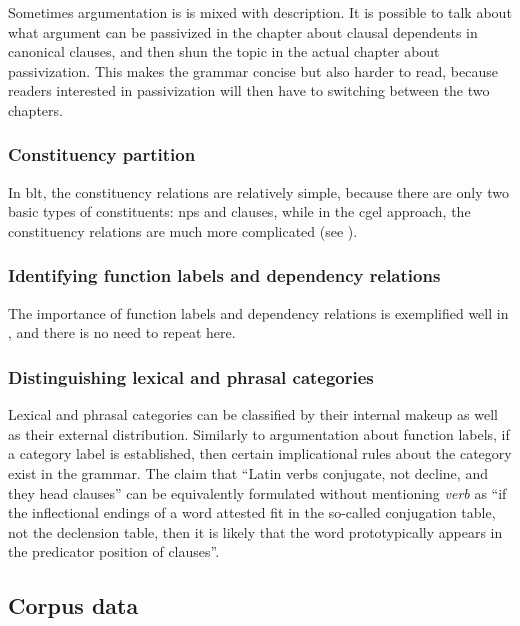 \documentclass[UTF8, a4paper, oneside, scheme=plain]{ctexart}
\newcommand*{\term}[1]{\emph{#1}}
\begin{document}
Sometimes argumentation is is mixed with description.
It is possible to talk about what argument can be passivized 
in the chapter about clausal dependents in canonical clauses,
and then shun the topic in the actual chapter about passivization.
This makes the grammar concise but also harder to read,
because readers interested in passivization 
will then have to switching between the two chapters.

\subsubsection{Constituency partition}

In \ac{blt}, the constituency relations are relatively simple,
because there are only two basic types of constituents: 
\ac{np}s and clauses,
while in the \ac{cgel} approach,
the constituency relations are much more complicated
(see ). 

\subsubsection{Identifying function labels and dependency relations}\label{sec:why-argumentation-function-label}

The importance of function labels and dependency relations 
is exemplified well in ,
and there is no need to repeat here.


\subsubsection{Distinguishing lexical and phrasal categories}

Lexical and phrasal categories can be classified by their internal makeup as well as 
their external distribution.
Similarly to argumentation about function labels,
if a category label is established,
then certain implicational rules about the category exist in the grammar.
The claim that 
``Latin verbs conjugate, not decline, and they head clauses''
can be equivalently formulated without mentioning \term{verb} as 
``if the inflectional endings of a word attested fit in the so-called conjugation table,
not the declension table,
then it is likely that the word prototypically appears in the predicator position of clauses''.

\subsection{Corpus data}
\end{document}
